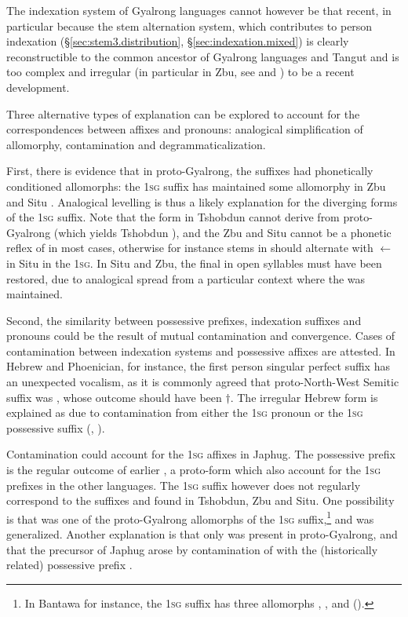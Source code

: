 The indexation system of Gyalrong languages cannot however be that recent, in particular because the stem alternation system, which contributes to person indexation (§\ref{sec:stem3.distribution}, §\ref{sec:indexation.mixed}) is clearly reconstructible to the common ancestor of Gyalrong languages and Tangut \citep{gong16stems} and is too complex and irregular (in particular in Zbu, see \citealt{jackson04showu} and \citealt{gong18these}) to be a recent development.

Three alternative types of explanation can be explored to account for the correspondences between affixes and pronouns: analogical simplification of allomorphy, contamination and degrammaticalization.

First, there is evidence that in proto-Gyalrong, the suffixes had phonetically conditioned allomorphs: the \textsc{1sg} suffix has maintained some allomorphy in Zbu \citep[46]{gongxun14agreement} and Situ \citep[198]{linxr93jiarong}. Analogical levelling is thus a likely explanation for the diverging forms of the \textsc{1sg} suffix. Note that the form  in Tshobdun  cannot derive from proto-Gyalrong  (which yields Tshobdun ), and the Zbu and Situ  cannot be a phonetic reflex of  in most cases, otherwise for instance stems in  should alternate with  $\leftarrow$  in Situ in the \textsc{1sg}.  In Situ and Zbu, the final  in open syllables must have been restored, due to analogical spread from a particular context where the  was maintained.

Second, the similarity between possessive prefixes, indexation suffixes and pronouns could be the result of mutual contamination and convergence. Cases of contamination between indexation systems and possessive affixes are attested. In Hebrew and Phoenician, for instance, the first person singular perfect suffix  has an unexpected vocalism, as it is commonly agreed that proto-North-West Semitic suffix was , whose outcome should have been $\dagger$. The irregular Hebrew form is explained as due to contamination from either the \textsc{1sg} pronoun  or the \textsc{1sg} possessive suffix  (\citealt[122-123;132-133]{jouon06}, \citealt[227--229]{suchard16vowels}).  

Contamination could account  for the \textsc{1sg} affixes in Japhug.  The possessive prefix  is the regular outcome of earlier , a proto-form which also account for the \textsc{1sg} prefixes in the other languages. The \textsc{1sg} suffix  however does not regularly correspond to the suffixes  and  found in Tshobdun, Zbu and Situ. One possibility is that  was one of the proto-Gyalrong allomorphs of the \textsc{1sg} suffix,\footnote{In Bantawa for instance, the \textsc{1sg} suffix has three allomorphs , , and  (\citealt[155]{doornenbal09}). } and was generalized. Another explanation is that only  was present in proto-Gyalrong, and that the   precursor of Japhug  arose by contamination of  with the (historically related) possessive prefix . 


